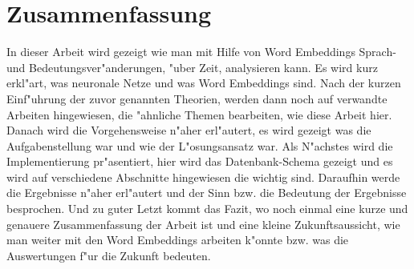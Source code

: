 \chapter*{Zusammenfassung}
In dieser Arbeit wird gezeigt wie man mit Hilfe von Word Embeddings Sprach- und Bedeutungsver"anderungen, "uber Zeit, analysieren kann. Es wird kurz erkl"art, was neuronale Netze und was Word Embeddings sind. Nach der kurzen Einf"uhrung der zuvor genannten Theorien, werden dann noch auf verwandte Arbeiten hingewiesen, die "ahnliche Themen bearbeiten, wie diese Arbeit hier. Danach wird die Vorgehensweise n"aher erl"autert, es wird gezeigt was die Aufgabenstellung war und wie der L"osungsansatz war. 
Als N"achstes wird die Implementierung pr"asentiert, hier wird das Datenbank-Schema gezeigt und es wird auf verschiedene Abschnitte hingewiesen die wichtig sind. Daraufhin werde die Ergebnisse n"aher erl"autert und der Sinn bzw. die Bedeutung der Ergebnisse besprochen. Und zu guter Letzt kommt das Fazit, wo noch einmal eine kurze und genauere Zusammenfassung der Arbeit ist und eine kleine Zukunftsaussicht, wie man weiter mit den Word Embeddings arbeiten k"onnte bzw. was die Auswertungen f"ur die Zukunft bedeuten.
